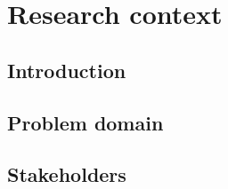 \section{Research context}

\subsection{Introduction}
\subsection{Problem domain}
\subsection{Stakeholders}

